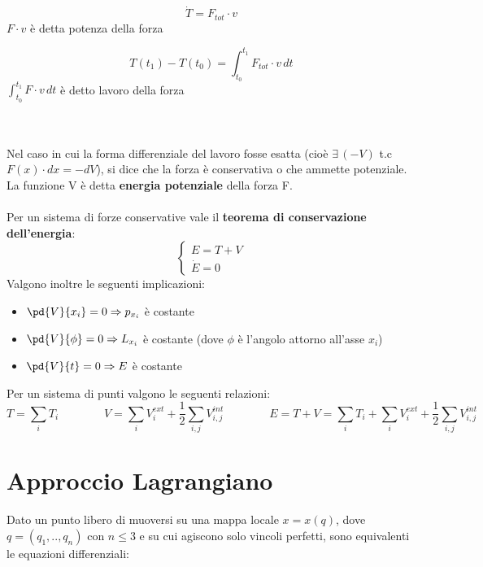 \documentclass{article}
\begin{document}
\begin{minipage}[c]{.45\columnwidth}
\begin{center}
$$ \dot T= F_{tot}\cdot v $$
\small $F\cdot v$ è detta potenza della forza
\end{center}
\end{minipage}
\begin{minipage}[c]{.45\columnwidth}
\begin{center}
$$ T(t_1)-T(t_0)=\int_{t_0}^{t_1}F_{tot}\cdot v \,dt $$
\small $\int_{t_0}^{t_1}F\cdot v \,dt$ è detto lavoro della forza
\end{center}
\end{minipage}
\\\\
Nel caso in cui la forma differenziale del lavoro fosse esatta (cioè $\exists\, (-V)$ t.c $F(x)\cdot dx=-dV$), si dice che la forza è conservativa o che ammette potenziale.
La funzione V è detta \textbf{energia potenziale} della forza F.\\\\
Per un sistema di forze conservative vale il \textbf{teorema di conservazione dell'energia}:
\begin{equation*}
    \begin{cases}
        E=T+V\\
        \dot E=0
    \end{cases}
\end{equation*}
Valgono inoltre le seguenti implicazioni:
\begin{itemize}
    \item $\pd{V}{x_i}=0\Rightarrow p_{x_i}$ è costante
    \item $\pd{V}{\phi}=0\Rightarrow L_{x_i}$ è costante (dove $\phi$ è l'angolo attorno all'asse $x_i$)
    \item $\pd{V}{t}=0\Rightarrow E$ è costante
\end{itemize}
Per un sistema di punti valgono le seguenti relazioni:
$$ T=\sum_i T_i \qquad \qquad V=\sum_i V_i^{ext} + \frac{1}{2}\sum_{i,j} V_{i,j}^{int} \qquad \qquad E=T+V=\sum_i T_i+\sum_i V_i^{ext}+\frac{1}{2}\sum_{i,j}V_{i,j}^{int}$$






\newpage
\section{Approccio Lagrangiano}
Dato un punto libero di muoversi su una mappa locale $x=x(q)$, dove $q=(q_1,..,q_n)$ con $n\leq3$ e su cui agiscono solo vincoli perfetti, sono equivalenti le equazioni differenziali:
\end{document}
